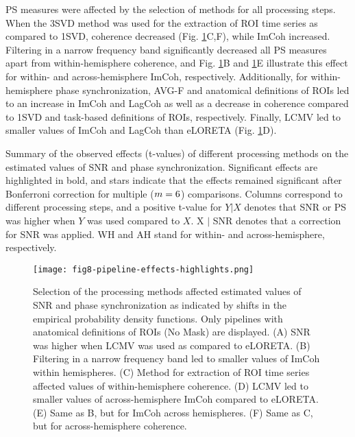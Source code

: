 \medskip

PS measures were affected by the selection of methods for all processing steps. When the 3SVD method was used for the extraction of ROI time series as compared to 1SVD, coherence decreased (Fig. \ref{fig:pipeline_effects_highlights}C,F), while ImCoh increased. Filtering in a narrow frequency band significantly decreased all PS measures apart from within-hemisphere coherence, and Fig. \ref{fig:pipeline_effects_highlights}B and \ref{fig:pipeline_effects_highlights}E illustrate this effect for within- and across-hemisphere ImCoh, respectively. Additionally, for within-hemisphere phase synchronization, AVG-F and anatomical definitions of ROIs led to an increase in ImCoh and LagCoh as well as a decrease in coherence compared to 1SVD and task-based definitions of ROIs, respectively. Finally, LCMV led to smaller values of ImCoh and LagCoh than eLORETA (Fig. \ref{fig:pipeline_effects_highlights}D).

\begin{table}[htbp]
    \small
    \centering
    \resizebox{\linewidth}{!}{\pipelineEffectsSummary}
    \caption{Summary of the observed effects (t-values) of different processing methods on the estimated values of SNR and phase synchronization. Significant effects are highlighted in bold, and stars indicate that the effects remained significant after Bonferroni correction for multiple ($m = 6$) comparisons. Columns correspond to different processing steps, and a positive t-value for $Y | X$ denotes that SNR or PS was higher when $Y$ was used compared to $X$. X $|$ SNR denotes that a correction for SNR was applied. WH and AH stand for within- and across-hemisphere, respectively.}
    \label{tab:pipeline_effects_summary}
\end{table}

\begin{figure}[htbp]
    \centering
    \texttt{[image: fig8-pipeline-effects-highlights.png]}
    \caption{Selection of the processing methods affected estimated values of SNR and phase synchronization as indicated by shifts in the empirical probability density functions. Only pipelines with anatomical definitions of ROIs (No Mask) are displayed. (A) SNR was higher when LCMV was used as compared to eLORETA. (B) Filtering in a narrow frequency band led to smaller values of ImCoh within hemispheres. (C) Method for extraction of ROI time series affected values of within-hemisphere coherence. (D) LCMV led to smaller values of across-hemisphere ImCoh compared to eLORETA. (E) Same as B, but for ImCoh across hemispheres. (F) Same as C, but for across-hemisphere coherence.}
    \label{fig:pipeline_effects_highlights}
\end{figure}
